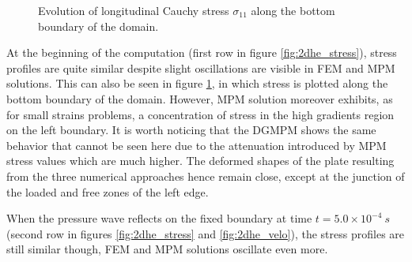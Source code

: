 \begin{figure}[h!]
  \centering
  
  \caption{Evolution of longitudinal Cauchy stress $\sigma_{11}$ along the bottom boundary of the domain.}
  \label{fig:he_lineplots_stress}
\end{figure}
At the beginning of the computation (first row in figure \ref{fig:2dhe_stress}), stress profiles are quite similar despite slight oscillations are visible in FEM and MPM solutions.
This can also be seen in figure \ref{fig:he_lineplots_stress}, in which stress is plotted along the bottom boundary of the domain.
However, MPM solution moreover exhibits, as for small strains problems, a concentration of stress in the high gradients region on the left boundary.
It is worth noticing that the DGMPM shows the same behavior that cannot be seen here due to the attenuation introduced by MPM stress values which are much higher.
The deformed shapes of the plate resulting from the three numerical approaches hence remain close, except at the junction of the loaded and free zones of the left edge.

When the pressure wave reflects on the fixed boundary at time $t=5.0\times 10^{-4}\:s$ (second row in figures \ref{fig:2dhe_stress} and \ref{fig:2dhe_velo}), the stress profiles are still similar though, FEM and MPM solutions oscillate even more.

